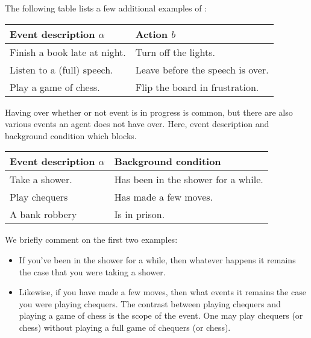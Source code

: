 \begin{note}
  The following table lists a few additional examples of :

  \begin{center}
    \bgroup
    \def\arraystretch{1.125}
    \begin{tabular}{R{.45\textwidth} L{.45\textwidth}}
      Event description \(\alpha\) & Action \(b\) \\
      \hline
      Finish a book late at night. & Turn off the lights. \\
      Listen to a (full) speech. & Leave before the speech is over. \\
      Play a game of chess. & Flip the board in frustration.
    \end{tabular}
    \egroup
  \end{center}

  \noindent%
  Having \ninf{} over whether or not event is in progress is common, but there are also various events an agent does not have \ninf{} over.
  Here, event description and background condition which blocks.

    \begin{center}
    \bgroup
    \def\arraystretch{1.125}
    \begin{tabular}{R{.45\textwidth} L{.45\textwidth}}
      Event description \(\alpha\) & Background condition \\
      \hline
      Take a shower. & Has been in the shower for a while. \\
      Play chequers & Has made a few moves. \\
      A bank robbery & Is in prison. \\
    \end{tabular}
    \egroup
  \end{center}

  \noindent%
  We briefly comment on the first two examples:

  \begin{itemize}
  \item
    If you've been in the shower for a while, then whatever happens it remains the case that you were taking a shower.
  \item
    Likewise, if you have made a few moves, then what events it remains the case you were playing chequers.
    The contrast between playing chequers and playing a game of chess is the scope of the event.
    One may play chequers (or chess) without playing a full game of chequers (or chess).
  \end{itemize}
\end{note}



